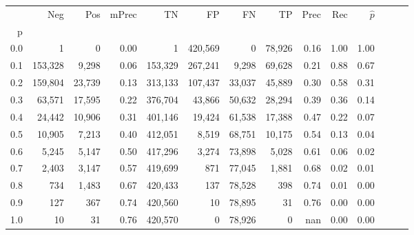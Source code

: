 \begin{tabular}{rrrrrrrrrrrrrr}
\toprule
{} &      Neg &     Pos & mPrec &       TN &       FP &      FN &      TP &  Prec &   Rec & $\hat{p}$ \\
p   &          &         &       &          &          &         &         &       &       &           \\
\midrule
0.0 &        1 &       0 &  0.00 &        1 &  420,569 &       0 &  78,926 &  0.16 &  1.00 &      1.00 \\
0.1 &  153,328 &   9,298 &  0.06 &  153,329 &  267,241 &   9,298 &  69,628 &  0.21 &  0.88 &      0.67 \\
0.2 &  159,804 &  23,739 &  0.13 &  313,133 &  107,437 &  33,037 &  45,889 &  0.30 &  0.58 &      0.31 \\
0.3 &   63,571 &  17,595 &  0.22 &  376,704 &   43,866 &  50,632 &  28,294 &  0.39 &  0.36 &      0.14 \\
0.4 &   24,442 &  10,906 &  0.31 &  401,146 &   19,424 &  61,538 &  17,388 &  0.47 &  0.22 &      0.07 \\
0.5 &   10,905 &   7,213 &  0.40 &  412,051 &    8,519 &  68,751 &  10,175 &  0.54 &  0.13 &      0.04 \\
0.6 &    5,245 &   5,147 &  0.50 &  417,296 &    3,274 &  73,898 &   5,028 &  0.61 &  0.06 &      0.02 \\
0.7 &    2,403 &   3,147 &  0.57 &  419,699 &      871 &  77,045 &   1,881 &  0.68 &  0.02 &      0.01 \\
0.8 &      734 &   1,483 &  0.67 &  420,433 &      137 &  78,528 &     398 &  0.74 &  0.01 &      0.00 \\
0.9 &      127 &     367 &  0.74 &  420,560 &       10 &  78,895 &      31 &  0.76 &  0.00 &      0.00 \\
1.0 &       10 &      31 &  0.76 &  420,570 &        0 &  78,926 &       0 &   nan &  0.00 &      0.00 \\
\bottomrule
\end{tabular}
